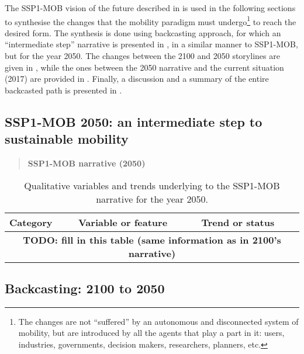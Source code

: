 The SSP1-MOB vision of the future described in  is used in the following sections to synthesise the changes that the mobility paradigm must undergo\footnote{The changes are not ``suffered'' by an autonomous and disconnected system of mobility, but are introduced by all the agents that play a part in it: users, industries, governments, decision makers, researchers, planners, etc.} to reach the desired form. The synthesis is done using backcasting approach, for which an ``intermediate step'' narrative is presented in , in a similar manner to SSP1-MOB, but for the year 2050. The changes between the 2100 and 2050 storylines are given in , while the ones between the 2050 narrative and the current situation (2017) are provided in . Finally, a discussion and a summary of the entire backcasted path is presented in .

\subsection{SSP1-MOB 2050: an intermediate step to sustainable mobility}
\label{ss:results:backcasting-2050-intermediate-step}

\blockquote{\sffamily \textbf{SSP1-MOB narrative (2050)}\\ \lipsum[1-5]
}

\begin{table}
\centering
\caption[SSP1-MOB (2050) qualitative variables]{Qualitative variables and trends underlying to the SSP1-MOB narrative for the year 2050.}
\label{t:ssp1-mob-2050-narrative-thesis}
\scriptsize
\begin{tabular}{p{2.5cm}p{3cm}p{8cm}}
\toprule
Category & Variable or feature & Trend or status \\
\midrule
\multicolumn{3}{c}{\textbf{TODO: fill in this table (same information as in 2100's narrative)}} \\
\bottomrule
\end{tabular}
\end{table}

\subsection{Backcasting: 2100 to 2050}
\label{ss:results:backcasting-2100-2050}

